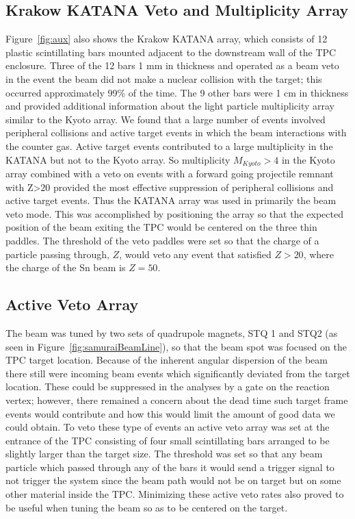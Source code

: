 \subsection{Krakow KATANA Veto and Multiplicity Array}
 Figure~\ref{fig:aux} also shows the Krakow KATANA array, which consists of 12 plastic scintillating bars mounted adjacent to the downstream wall of the TPC enclosure. Three of the 12 bars 1 mm in thickness and operated as a beam veto in the event the beam did not make a nuclear collision with the target; this occurred approximately 99\% of the time. The 9 other bars were 1 cm in thickness and provided additional information about the light particle multiplicity array similar to the Kyoto array. We found that a large number of events involved peripheral collisions and active target events in which the beam interactions with the counter gas. Active target events contributed to a large multiplicity in the KATANA but not to the Kyoto array. So multiplicity $M_{Kyoto} > 4$ in the Kyoto array combined with a veto on events with a forward going projectile remnant with Z>20 provided the most effective suppression of peripheral collisions and active target events. Thus the KATANA array was used in primarily the beam veto mode. This was accomplished by positioning the array so that the expected position of the beam exiting the TPC would be centered on the three thin paddles. The threshold of the veto paddles were set so that the charge of a particle passing through, $Z$, would veto any event that satisfied $Z > 20$, where the charge of the Sn beam is $Z=50$. 


\subsection{Active Veto Array}
The beam was tuned by two sets of quadrupole  magnets, STQ 1 and STQ2 (as seen in Figure~\ref{fig:samuraiBeamLine}), so that the beam spot was focused on the TPC target location. Because of the inherent angular dispersion of the beam there still were incoming beam events which significantly deviated from the target location. These could be suppressed in the analyses by a gate on the reaction vertex; however, there remained a concern about the dead time such target frame events would contribute and how this would limit the amount of good data we could obtain.  To veto these type of events an active veto array was set at the entrance of the TPC consisting of four small scintillating bars arranged to be slightly larger than the target size. The threshold was set so that any beam particle which passed through any of the bars it would send a trigger signal to not trigger the system since the beam path would not be on target but on some other material inside the TPC. Minimizing these active veto rates also proved to be useful when tuning the beam so as to be centered on the target.


